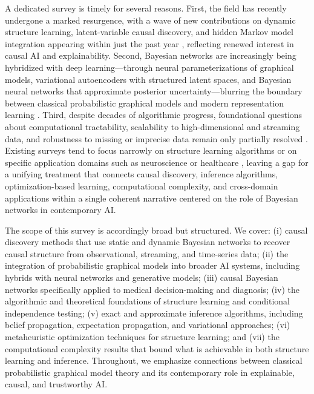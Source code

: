 A dedicated survey is timely for several reasons. First, the field has recently undergone a marked resurgence, with a wave of new contributions on dynamic structure learning, latent-variable causal discovery, and hidden Markov model integration appearing within just the past year \cite{zhang2026causalc,zhang2026causale,zhang2026causalf,zhang2026causalg,zhang2026causalh}, reflecting renewed interest in causal AI and explainability. Second, Bayesian networks are increasingly being hybridized with deep learning---through neural parameterizations of graphical models, variational autoencoders with structured latent spaces, and Bayesian neural networks that approximate posterior uncertainty---blurring the boundary between classical probabilistic graphical models and modern representation learning \cite{j2016composing,gal2015bayesian,polson2023generative}. Third, despite decades of algorithmic progress, foundational questions about computational tractability, scalability to high-dimensional and streaming data, and robustness to missing or imprecise data remain only partially resolved \cite{henrion2013why,dagum1993approximating,kuipers2021efficient}. Existing surveys tend to focus narrowly on structure learning algorithms \cite{kitson2023survey,zhou2011structure} or on specific application domains such as neuroscience \cite{bielza2014bayesian} or healthcare \cite{polotskaya2024bayesian}, leaving a gap for a unifying treatment that connects causal discovery, inference algorithms, optimization-based learning, computational complexity, and cross-domain applications within a single coherent narrative centered on the role of Bayesian networks in contemporary AI.

The scope of this survey is accordingly broad but structured. We cover: (i) causal discovery methods that use static and dynamic Bayesian networks to recover causal structure from observational, streaming, and time-series data; (ii) the integration of probabilistic graphical models into broader AI systems, including hybrids with neural networks and generative models; (iii) causal Bayesian networks specifically applied to medical decision-making and diagnosis; (iv) the algorithmic and theoretical foundations of structure learning and conditional independence testing; (v) exact and approximate inference algorithms, including belief propagation, expectation propagation, and variational approaches; (vi) metaheuristic optimization techniques for structure learning; and (vii) the computational complexity results that bound what is achievable in both structure learning and inference. Throughout, we emphasize connections between classical probabilistic graphical model theory and its contemporary role in explainable, causal, and trustworthy AI.


